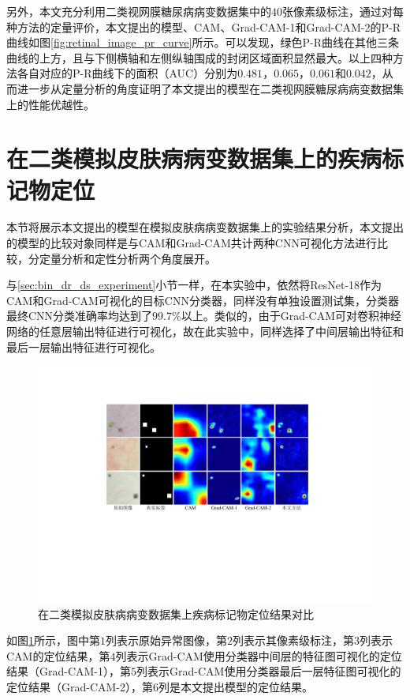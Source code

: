 另外，本文充分利用二类视网膜糖尿病病变数据集中的$40$张像素级标注，通过对每种方法的定量评价，本文提出的模型、CAM、Grad-CAM-1和Grad-CAM-2的P-R曲线如图\ref{fig:retinal_image_pr_curve}所示。可以发现，绿色P-R曲线在其他三条曲线的上方，且与下侧横轴和左侧纵轴围成的封闭区域面积显然最大。以上四种方法各自对应的P-R曲线下的面积（AUC）分别为$0.481$，$0.065$，$0.061$和$0.042$，从而进一步从定量分析的角度证明了本文提出的模型在二类视网膜糖尿病病变数据集上的性能优越性。

\section{在二类模拟皮肤病病变数据集上的疾病标记物定位}\label{sec:bin_simulated_ds_experiment}
本节将展示本文提出的模型在模拟皮肤病病变数据集上的实验结果分析，本文提出的模型的比较对象同样是与CAM和Grad-CAM共计两种CNN可视化方法进行比较，分定量分析和定性分析两个角度展开。

与\ref{sec:bin_dr_ds_experiment}小节一样，在本实验中，依然将ResNet-18作为CAM和Grad-CAM可视化的目标CNN分类器，同样没有单独设置测试集，分类器最终CNN分类准确率均达到了$99.7\%$以上。类似的，由于Grad-CAM可对卷积神经网络的任意层输出特征进行可视化，故在此实验中，同样选择了中间层输出特征和最后一层输出特征进行可视化。
\begin{figure}[h]
	\centering
	\includegraphics[width=1.0\textwidth]{figure/pr_curve_skin_image.pdf}
	\caption{在二类模拟皮肤病病变数据集上疾病标记物定位结果对比} 
	\label{fig:simulated_skin}
\end{figure}

如图\ref{fig:simulated_skin}所示，图中第$1$列表示原始异常图像，第$2$列表示其像素级标注，第$3$列表示CAM的定位结果，第$4$列表示Grad-CAM使用分类器中间层的特征图可视化的定位结果（Grad-CAM-1），第$5$列表示Grad-CAM使用分类器最后一层特征图可视化的定位结果（Grad-CAM-2），第$6$列是本文提出模型的定位结果。

